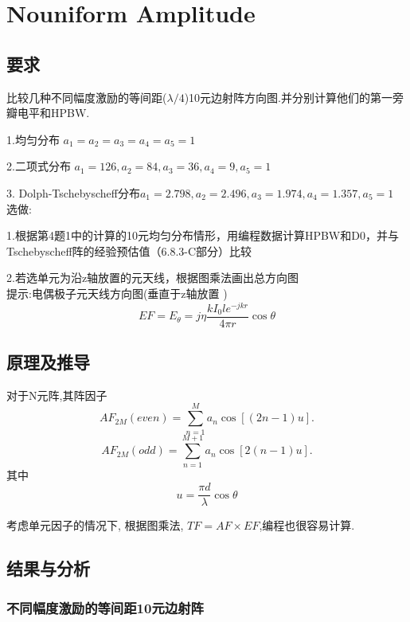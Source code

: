 
\section{Nouniform Amplitude}
\subsection{要求}
\noindent 比较几种不同幅度激励的等间距($\lambda/4$)10元边射阵方向图.并分别计算他们的第一旁瓣电平和HPBW. 


1.均匀分布  $a_1=a_2=a_3=a_4=a_5=1$

2.二项式分布 $a_1=126, a_2=84, a_3=36, a_4=9, a_5=1$

3. Dolph-Tschebyscheff分布$a_1=2.798, a_2=2.496, a_3=1.974, a_4=1.357, a_5=1$
\\

\noindent 选做:

1.根据第4题1中的计算的10元均匀分布情形，用编程数据计算HPBW和D0，并与Tschebyscheff阵的经验预估值（6.8.3-C部分）比较

2.若选单元为沿z轴放置的元天线，根据图乘法画出总方向图
\\
\noindent 提示:电偶极子元天线方向图(垂直于z轴放置 )
\begin{equation}
EF=E_\theta=j\eta\dfrac{kI_0le^{-jkr}}{4\pi r}\cos\theta
\end{equation}


\subsection{原理及推导}
对于N元阵,其阵因子
\begin{equation}
AF_{2M}(even)=\sum_{n=1}^{M}a_n\cos\left[\left(2n-1\right)u\right].
\end{equation}
\begin{equation}
AF_{2M}(odd)=\sum_{n=1}^{M+1}a_n\cos\left[2\left(n-1\right)u\right].
\end{equation}
其中
\begin{equation}
u=\frac{\pi d}{\lambda}\cos\theta
\end{equation}

考虑单元因子的情况下, 根据图乘法, $TF=AF\times EF$,编程也很容易计算.  

\subsection{结果与分析}
\subsubsection{不同幅度激励的等间距10元边射阵}

